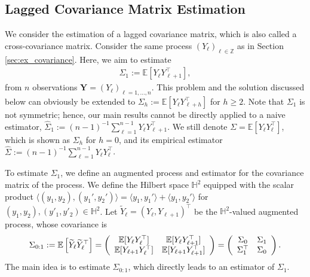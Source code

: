 \documentclass[11pt,a4paper]{article}
\theoremstyle{remark}
\theoremstyle{definition}
\theoremstyle{definition}
\renewcommand{\hat}{\widehat}
\renewcommand{\tilde}{\widetilde}
\newcommand{\rc}{\color{black}}
\begin{document}
\begin{bibunit}[apalike]
\subsection{Lagged Covariance Matrix Estimation} \label{sec:lagged_covariance}
We consider the estimation of a lagged covariance matrix, which is also called a cross-covariance matrix.
Consider the same process $(Y_\ell)_{\ell \in \mathbb{Z}}$ as in Section \ref{sec:ex_covariance}. Here, we aim to estimate 
\begin{align*}
    \Sigma_1 := \mathbb{E}[Y_{\ell} Y_{\ell+1}^\top],
\end{align*}
from $n$ observations $\mathbf{Y} = (Y_\ell)_{\ell=1,\ldots,n}$.
This problem and the solution discussed below {\rc can obviously be extended to} $\Sigma_h := \mathbb{E}[Y_{\ell} Y_{\ell+h}^\top]$ for $h \geq 2$. 
Note that $\Sigma_1$ is not symmetric; hence, our main results cannot be directly applied to a naive estimator, $\hat{\Sigma}_1 := (n-1)^{-1} \sum_{\ell=1}^{n-1} Y_\ell Y_{\ell + 1}^\top$.
We still denote $\Sigma =\mathbb{E}[Y_{\ell} Y_{\ell}^\top]$, which is shown as $\Sigma_h$ for $h=0$, and its empirical estimator $\hat{\Sigma} := (n-1)^{-1} \sum_{\ell=1}^{n-1} Y_\ell Y_\ell^\top$.



To estimate $\Sigma_1$, we define an augmented process and estimator for the covariance matrix of the process.
We define the Hilbert space $\mathbb{H}^2$ equipped with the scalar product $\langle(y_1,y_2),(y_1',y_2')\rangle = \langle y_1,y_1'\rangle  + \langle y_1,y_2'\rangle $ for $(y_1,y_2), (y'_1,y'_2) \in \mathbb{H}^2$. 
Let $\tilde{Y}_{\ell} = (Y_\ell,Y_{\ell+1})^\top$ be the $\mathbb{H}^2$-valued augmented process, whose covariance is
\begin{align}
    \Sigma_{0:1} := \mathbb{E}\left[\tilde{Y}_{\ell} \tilde{Y}_{\ell}^\top \right] = \left(
\begin{array}{c c}
\mathbb{E}[Y_{\ell} Y_{\ell}^\top] & \mathbb{E}[Y_{\ell} Y_{\ell+1}^\top] \\
\mathbb{E}[Y_{\ell + 1} Y_{\ell}^\top] & \mathbb{E}[Y_{\ell + 1} Y_{\ell + 1}^\top]
\end{array}
\right) = \left(
\begin{array}{c c}
\Sigma_0 & \Sigma_1 \\
\Sigma_1^\top &\Sigma_0
\end{array}
\right). \label{def:lagged_cov}
\end{align}
The main idea is to estimate $\Sigma_{0:1}$, which directly leads to an estimator of $\Sigma_1$.


\end{bibunit}
\end{document}
